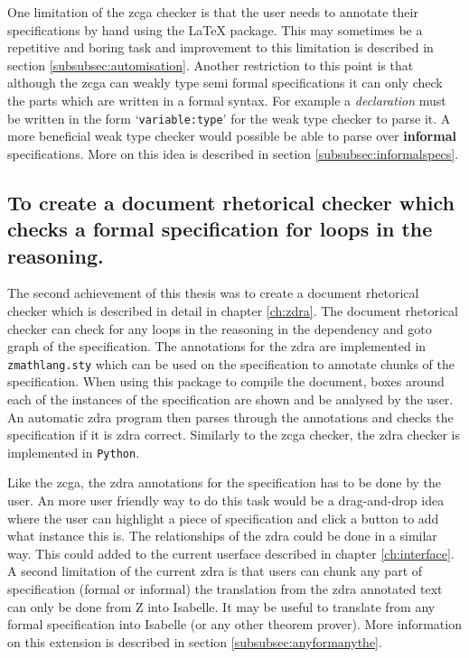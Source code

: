 One limitation of the \gls{zcga} checker is that the user needs to annotate their specifications by hand using the \LaTeX{} package. This may sometimes be a repetitive and boring task and improvement to this limitation is described in section \ref{subsubsec:automisation}. Another restriction to this point is that although the \gls{zcga} can weakly type semi formal specifications it can only check the parts which are written in a formal syntax. For example a \textit{declaration} must be written in the form `\texttt{variable:type}' for the weak type checker to parse it. A more beneficial weak type checker would possible be able to parse over \textbf{informal} specifications. More on this idea is described in section \ref{subsubsec:informalspecs}.

\subsection{To create a document rhetorical checker which checks a formal specification for loops in the reasoning.}

The second achievement of this thesis was to create a document rhetorical checker which is described in detail in chapter \ref{ch:zdra}. The document rhetorical checker can check for any loops in the reasoning in the dependency and goto graph of the specification. The annotations for the \gls{zdra} are implemented in \texttt{zmathlang.sty} which can be used on the specification to annotate chunks of the specification. When using this package to compile the document, boxes around each of the instances of the specification are shown and be analysed by the user. An automatic \gls{zdra} program then parses through the annotations and checks the specification if it is \gls{zdra} correct. Similarly to the \gls{zcga} checker, the \gls{zdra} checker is implemented in \texttt{Python}.

Like the \gls{zcga}, the \gls{zdra} annotations for the specification has to be done by the user. An more user friendly way to do this task would be a drag-and-drop idea where the user can highlight a piece of specification and click a button to add what instance this is. The relationships of the \gls{zdra} could be done in a similar way. This could added to the current userface described in chapter \ref{ch:interface}. A second limitation of the current \gls{zdra} is that users can chunk any part of specification (formal or informal) the translation from the \gls{zdra} annotated text can only be done from Z into Isabelle. It may be useful to translate from any formal specification into Isabelle (or any other theorem prover). More information on this extension is described in section \ref{subsubsec:anyformanythe}.

